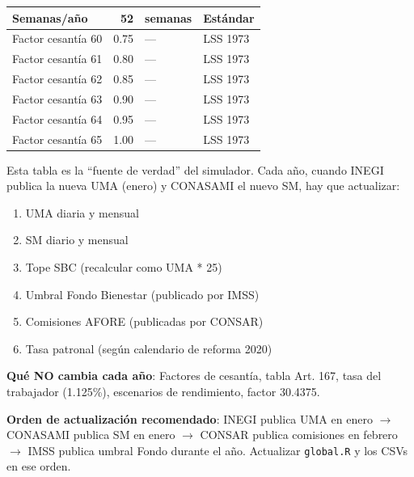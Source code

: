 \documentclass[11pt,a4paper]{report}
\begin{document}
\begin{tcolorbox}[colback=blue!5!white, colframe=blue!75!black, title=\textbf{Definici\'on Formal}]
\begin{center}
\begin{longtable}{lrll}
Semanas/a\~no & 52 & semanas & Est\'andar \\
\midrule
Factor cesant\'ia 60 & 0.75 & --- & LSS 1973 \\
Factor cesant\'ia 61 & 0.80 & --- & LSS 1973 \\
Factor cesant\'ia 62 & 0.85 & --- & LSS 1973 \\
Factor cesant\'ia 63 & 0.90 & --- & LSS 1973 \\
Factor cesant\'ia 64 & 0.95 & --- & LSS 1973 \\
Factor cesant\'ia 65 & 1.00 & --- & LSS 1973 \\
\bottomrule
\end{longtable}
\end{center}
\end{tcolorbox}

\begin{tcolorbox}[colback=green!5!white, colframe=green!50!black, title=\textbf{Intuici\'on}]
Esta tabla es la ``fuente de verdad'' del simulador. Cada a\~no, cuando INEGI publica la nueva UMA (enero) y CONASAMI el nuevo SM, hay que actualizar:
\begin{enumerate}[nosep]
\item UMA diaria y mensual
\item SM diario y mensual
\item Tope SBC (recalcular como UMA * 25)
\item Umbral Fondo Bienestar (publicado por IMSS)
\item Comisiones AFORE (publicadas por CONSAR)
\item Tasa patronal (seg\'un calendario de reforma 2020)
\end{enumerate}

\textbf{Qu\'e NO cambia cada a\~no}: Factores de cesant\'ia, tabla Art. 167, tasa del trabajador (1.125\%), escenarios de rendimiento, factor 30.4375.

\textbf{Orden de actualizaci\'on recomendado}: INEGI publica UMA en enero $\rightarrow$ CONASAMI publica SM en enero $\rightarrow$ CONSAR publica comisiones en febrero $\rightarrow$ IMSS publica umbral Fondo durante el a\~no. Actualizar \texttt{global.R} y los CSVs en ese orden.
\end{tcolorbox}
\end{document}
